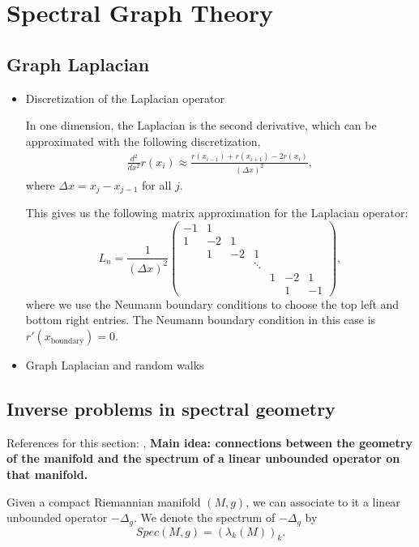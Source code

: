 \documentclass{article}
\begin{document}
\section{Spectral Graph Theory}
\subsection{Graph Laplacian}
\begin{itemize}
    \item Discretization of the Laplacian operator
    
  In one dimension, the Laplacian is the second derivative, which can be approximated with the following discretization,
\begin{align}
    \frac{d^2}{dx^2}r(x_i) \approx \frac{r(x_{i-1}) + r(x_{i+1}) - 2 r(x_i)}{(\Delta x)^2},
\end{align}
where $\Delta x = x_j - x_{j-1}$ for all $j$.

This gives us the following matrix approximation for the Laplacian operator:
\begin{equation}
L_n = \frac{1}{(\Delta x)^2}
\begin{pmatrix}
    -1  &1  &   &   &   &   &\\
    1   &-2 &1  &   &   &   &\\
        &1  &-2 &1  &   &   &\\
        &   &   &\ddots & & &\\
        &   &   &   &1  &-2 &1\\
        &   &   &   &   &1  &-1
\end{pmatrix},
\end{equation}
where we use the Neumann boundary conditions to choose the top left and bottom right entries. The Neumann boundary condition in this case is $r'(x_{\text{boundary}}) = 0$.

\item Graph Laplacian and random walks

\end{itemize}

\subsection{Inverse problems in spectral geometry}
References for this section: \cite{lablee_spectral_2015}, \cite{kac_can_1966}
\textbf{Main idea: connections between the geometry of the manifold and the spectrum of a linear unbounded operator on that manifold. }

Given a compact Riemannian manifold $(M,g)$, we can associate to it a linear unbounded operator $-\Delta_g$. We denote the spectrum of $-\Delta_g$ by 
$$Spec(M,g) = (\lambda_k(M))_k.$$
\end{document}
